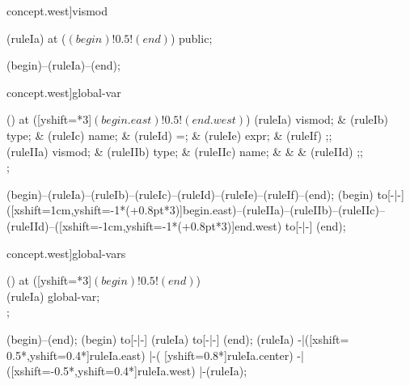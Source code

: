 \begin{syntax}[[xshift=22mm]concept.west]{vismod}
  
  \node[terminal] (ruleIa) at ($(begin)!0.5!(end)$) {public};
  
  \draw[path] (begin)--(ruleIa)--(end);
\end{syntax}

\begin{syntax}[[xshift=22mm]concept.west]{global-var}
  
  \node[sequence,anchor=north] () at ([yshift=\syntaxrulenodeheight-0.8pt*3]$(begin.east)!0.5!(end.west)$) {
    \node[nonterminal] (ruleIa) {vismod};
    &
    \node[nonterminal] (ruleIb) {type};
    &
    \node[terminal]    (ruleIc) {name};
    &
    \node[terminal]    (ruleId) {=};
    &
    \node[nonterminal] (ruleIe) {expr};
    &
    \node[terminal]    (ruleIf) {;};
    \\
    \node[nonterminal] (ruleIIa) {vismod};
    &
    \node[nonterminal] (ruleIIb) {type};
    &
    \node[terminal]    (ruleIIc) {name};
    &
    &
    &
    \node[terminal]    (ruleIId) {;};
    \\
  };
  
  \draw[path] (begin)--(ruleIa)--(ruleIb)--(ruleIc)--(ruleId)--(ruleIe)--(ruleIf)--(end);
  \draw[path] (begin) to[-|-] ([xshift=1cm,yshift=-1*(\syntaxruledist+0.8pt*3)]begin.east)--(ruleIIa)--(ruleIIb)--(ruleIIc)--(ruleIId)--([xshift=-1cm,yshift=-1*(\syntaxruledist+0.8pt*3)]end.west) to[-|-] (end);
\end{syntax}

\begin{syntax}[[xshift=24mm]concept.west]{global-vars}
  
  \node[sequence] () at ([yshift=\syntaxruledist-0.8pt*3]$(begin)!0.5!(end)$) {
    \\
    \node[nonterminal]    (ruleIa) {global-var};
    \\
  };
  
  \draw[path] (begin)--(end);
  \draw[path] (begin) to[-|-] (ruleIa) to[-|-] (end);
  \draw[path] (ruleIa)
            -|([xshift= 0.5*\syntaxruledist,yshift=0.4*\syntaxruledist]ruleIa.east)
            |-(                            [yshift=0.8*\syntaxruledist]ruleIa.center)
            -|([xshift=-0.5*\syntaxruledist,yshift=0.4*\syntaxruledist]ruleIa.west)
            |-(ruleIa);
\end{syntax}

